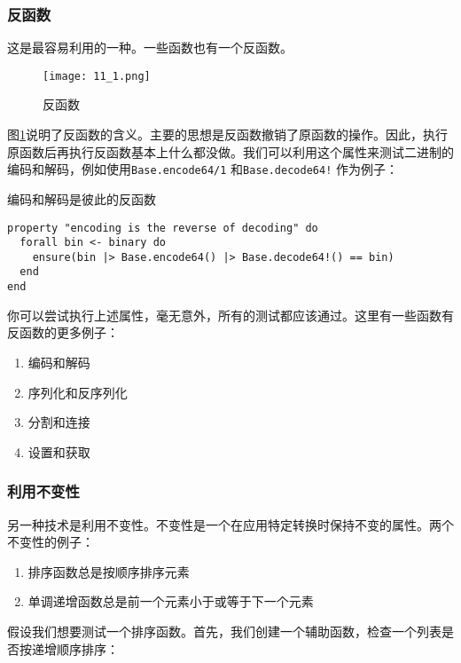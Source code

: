 \subsubsection{反函数}

这是最容易利用的一种。一些函数也有一个反函数。

\begin{figure}[!ht]
    \centering
    \texttt{[image: 11\_1.png]}
    \caption{反函数}
    \label{fig:11_1}
\end{figure}


图\ref{fig:11_1}说明了反函数的含义。主要的思想是反函数撤销了原函数的操作。因此，执行原函数后再执行反函数基本上什么都没做。我们可以利用这个属性来测试二进制的编码和解码，例如使用\texttt{Base.encode64/1} 和\texttt{Base.decode64!} 作为例子：

\begin{code}{编码和解码是彼此的反函数}
\begin{verbatim}
property "encoding is the reverse of decoding" do
  forall bin <- binary do
    ensure(bin |> Base.encode64() |> Base.decode64!() == bin)
  end
end
\end{verbatim}
\label{lst:encoding_is_the_reverse_of_decoding}
\end{code}

你可以尝试执行上述属性，毫无意外，所有的测试都应该通过。这里有一些函数有反函数的更多例子：
\begin{enumerate}
\item  编码和解码
\item  序列化和反序列化
\item  分割和连接
\item  设置和获取
\end{enumerate}

\subsubsection{利用不变性}

另一种技术是利用不变性。不变性是一个在应用特定转换时保持不变的属性。两个不变性的例子：
\begin{enumerate}
\item  排序函数总是按顺序排序元素
\item  单调递增函数总是前一个元素小于或等于下一个元素
\end{enumerate}

假设我们想要测试一个排序函数。首先，我们创建一个辅助函数，检查一个列表是否按递增顺序排序：

